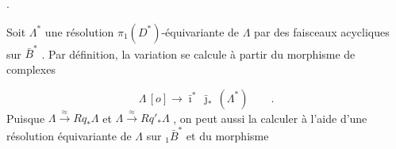 \begin{center}
\quad .
\end{center}
Soit $\Lambda^*$ une résolution $\pi_1(D^*)$-équivariante de $\Lambda$ par des faisceaux acycliques sur $\bar{B}^*$ . Par définition, la variation se calcule à partir du morphisme de complexes

\begin{equation*}
\Lambda\,[o] \longrightarrow \bar{\imath}^*\, \bar{\jmath}_*\,(\Lambda^*) \qquad .
\end{equation*}
Puisque $\Lambda \stackrel{\approx}{\longrightarrow} Rq_*\Lambda$ et $\Lambda \stackrel{\approx}{\longrightarrow} Rq'_*\Lambda$ , on peut aussi la calculer  à l'aide d'une résolution équivariante de $\Lambda$ sur ${}_1\bar{B}^*$ et du morphisme

